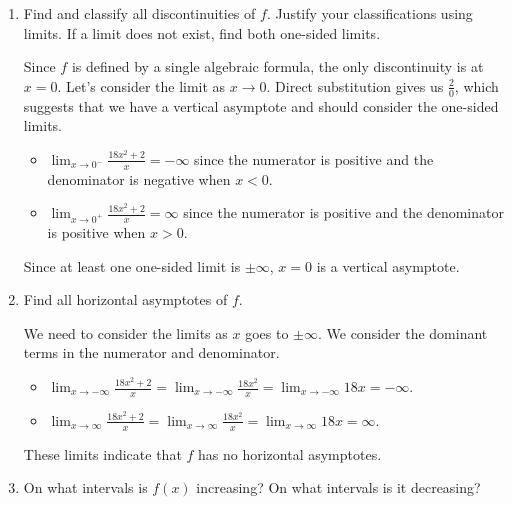 \documentclass{article}
\begin{document}
\begin{enumerate}[resume, topsep=0pt]
\begin{enumerate}
  \item
    \begin{problem}[\vfill]
      Find and classify all discontinuities of $f$. Justify your classifications using limits. If a limit does not exist, find both one-sided limits. 
    \end{problem}

    \begin{solution}
      Since $f$ is defined by a single algebraic formula, the only discontinuity is at
      $x=0$. Let's consider the limit as $x \to 0$. Direct substitution gives us 
      $\frac{2}{0}$, which suggests that we have a vertical asymptote and should
      consider the one-sided limits.
      \begin{itemize}
        \item $\displaystyle \lim_{x \to 0^-} \frac{18x^2+2}{x} = -\infty$ since
        the numerator is positive and the denominator is negative when $x<0$. 
        \item $\displaystyle \lim_{x \to 0^+} \frac{18x^2+2}{x} = \infty$ since
        the numerator is positive and the denominator is positive when $x>0$. 
      \end{itemize}
      Since at least one one-sided limit is $\pm \infty$, $x=0$ is a vertical asymptote.
    \end{solution}

  \item
    \begin{problem}[\nstretch{0.75}]
      Find all horizontal asymptotes of $f$.
    \end{problem}

    \begin{solution}
      We need to consider the limits as $x$ goes to $\pm \infty$. We consider
      the dominant terms in the numerator and denominator.
      \begin{itemize}
        \item $\displaystyle \lim_{x \to -\infty} \frac{18x^2+2}{x} =
        \lim_{x \to -\infty} \frac{18x^2}{x} = \lim_{x \to -\infty} 18x = -\infty$.
        \item $\displaystyle \lim_{x \to \infty} \frac{18x^2+2}{x} =
        \lim_{x \to \infty} \frac{18x^2}{x} = \lim_{x \to \infty} 18x = \infty$.
      \end{itemize}
      These limits indicate that $f$ has no horizontal asymptotes.
    \end{solution}

  \item
    \begin{problem}[\vfill]
      On what intervals is $f(x)$ increasing? On what intervals is it decreasing?
    \end{problem}


\end{enumerate}
\end{enumerate}
\end{document}
